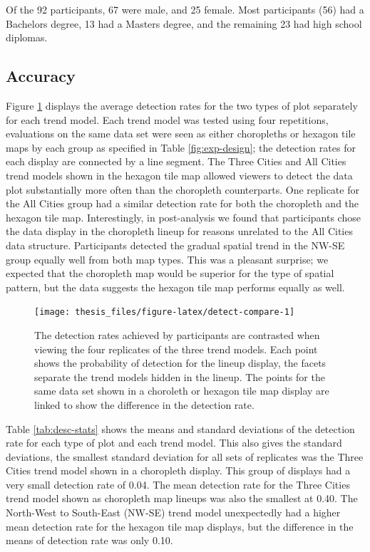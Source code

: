 \documentclass{monashthesis}
\begin{document}
Of the 92 participants, 67 were male, and 25 female. Most participants (56) had a Bachelors degree, 13 had a Masters degree, and the remaining 23 had high school diplomas.

\hypertarget{accuracy}{%
\subsection{Accuracy}\label{accuracy}}

Figure \ref{fig:detect-compare} displays the average detection rates for the two types of plot separately for each trend model. Each trend model was tested using four repetitions, evaluations on the same data set were seen as either choropleths or hexagon tile maps by each group as specified in Table \ref{fig:exp-design}; the detection rates for each display are connected by a line segment. The Three Cities and All Cities trend models shown in the hexagon tile map allowed viewers to detect the data plot substantially more often than the choropleth counterparts.
One replicate for the All Cities group had a similar detection rate for both the choropleth and the hexagon tile map. Interestingly, in post-analysis we found that participants chose the data display in the choropleth lineup for reasons unrelated to the All Cities data structure.
Participants detected the gradual spatial trend in the NW-SE group equally well from both map types. This was a pleasant surprise; we expected that the choropleth map would be superior for the type of spatial pattern, but the data suggests the hexagon tile map performs equally as well.

\begin{figure}

{\centering \texttt{[image: thesis\_files/figure-latex/detect-compare-1]} 

}

\caption{The detection rates achieved by participants are contrasted when viewing the four replicates of the three trend models. Each point shows the probability of detection for the lineup display, the facets separate the trend models hidden in the lineup. The points for the same data set shown in a choroleth or hexagon tile map display are linked to show the difference in the detection rate.}\label{fig:detect-compare}
\end{figure}

Table \ref{tab:desc-stats} shows the means and standard deviations of the detection rate for each type of plot and each trend model. This also gives the standard deviations, the smallest standard deviation for all sets of replicates was the Three Cities trend model shown in a choropleth display. This group of displays had a very small detection rate of 0.04. The mean detection rate for the Three Cities trend model shown as choropleth map lineups was also the smallest at 0.40.
The North-West to South-East (NW-SE) trend model unexpectedly had a higher mean detection rate for the hexagon tile map displays, but the difference in the means of detection rate was only 0.10.
\end{document}
